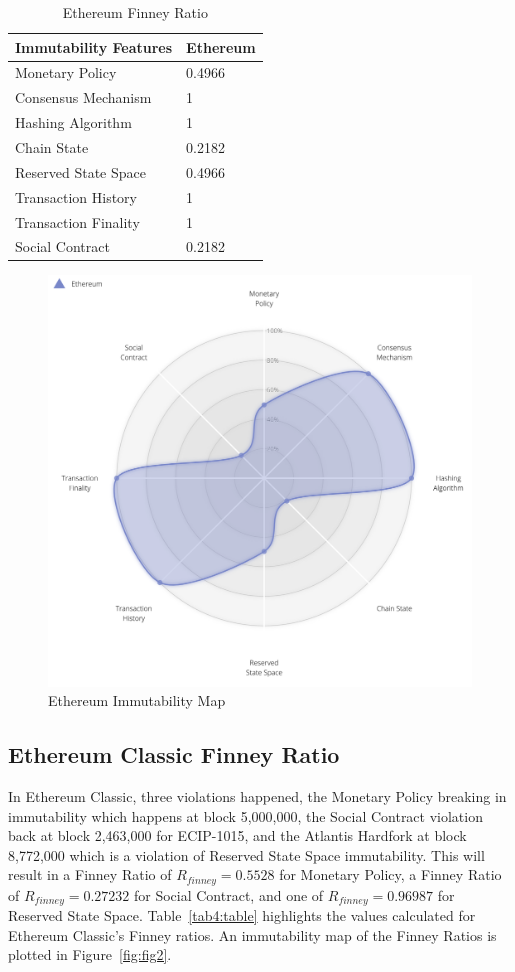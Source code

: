\documentclass{article}
\begin{document}
\begin{table}
 \caption{Ethereum Finney Ratio}
  \centering
  \begin{tabular}{ll}
    \toprule
    \cmidrule(r){1-2}
    Immutability Features & Ethereum \\
    \midrule
    Monetary Policy & 0.4966     \\
    Consensus Mechanism & 1     \\
    Hashing Algorithm & 1     \\
    Chain State & 0.2182     \\
    Reserved State Space & 0.4966     \\
    Transaction History & 1     \\
    Transaction Finality & 1     \\
    Social Contract & 0.2182     \\
    \bottomrule
  \end{tabular}
  \label{tab3:table}
\end{table}

\begin{figure}
  \centering
  \includegraphics[width=12cm]{eth.png}
  \caption{Ethereum Immutability Map}
  \label{fig:fig1}
\end{figure}

\subsection{Ethereum Classic Finney Ratio}
In Ethereum Classic, three violations happened, the Monetary Policy breaking in immutability which happens at block 5,000,000, the Social Contract violation back at block 2,463,000 for ECIP-1015, and the Atlantis Hardfork at block 8,772,000 which is a violation of Reserved State Space immutability. This will result in a Finney Ratio of $R_{finney} = 0.5528$ for Monetary Policy, a Finney Ratio of $R_{finney} = 0.27232$ for Social Contract, and one of $R_{finney} = 0.96987$ for Reserved State Space. Table~\ref{tab4:table} highlights the values calculated for Ethereum Classic's Finney ratios. An immutability map of the Finney Ratios is plotted in Figure~\ref{fig:fig2}.
\end{document}

